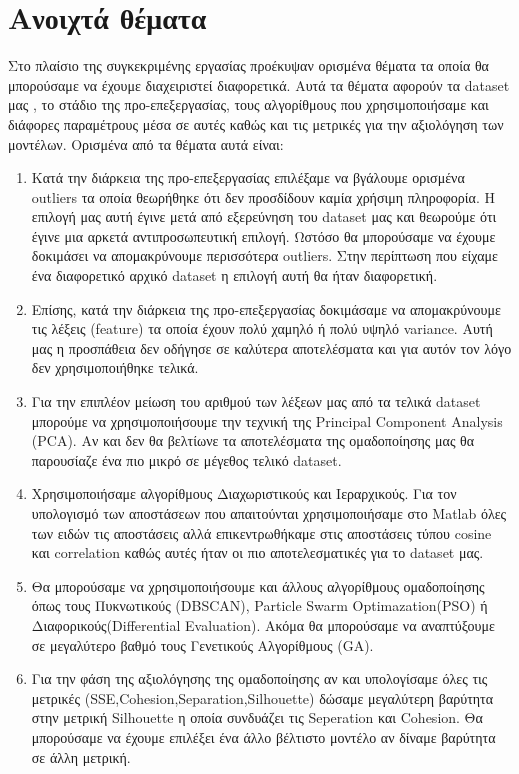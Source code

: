 \chapter{Ανοιχτά θέματα}\label{chapter:openissues}
Στο πλαίσιο της συγκεκριμένης εργασίας προέκυψαν ορισμένα θέματα τα οποία θα μπορούσαμε να έχουμε διαχειριστεί διαφορετικά. Αυτά τα θέματα αφορούν τα dataset μας , το στάδιο της προ-επεξεργασίας, τους αλγορίθμους που χρησιμοποιήσαμε και διάφορες παραμέτρους μέσα σε αυτές καθώς και τις μετρικές για την αξιολόγηση των μοντέλων. Ορισμένα από τα θέματα αυτά είναι:

\begin{enumerate}
    \item Κατά την διάρκεια της προ-επεξεργασίας επιλέξαμε να βγάλουμε ορισμένα outliers τα οποία θεωρήθηκε ότι δεν προσδίδουν καμία χρήσιμη πληροφορία. Η επιλογή μας αυτή έγινε μετά από εξερεύνηση του dataset μας και θεωρούμε ότι έγινε μια αρκετά αντιπροσωπευτική επιλογή. Ωστόσο θα μπορούσαμε να έχουμε δοκιμάσει να απομακρύνουμε περισσότερα outliers. Στην περίπτωση που είχαμε ένα διαφορετικό αρχικό dataset η επιλογή αυτή θα ήταν διαφορετική.
    \item Επίσης, κατά την διάρκεια της προ-επεξεργασίας δοκιμάσαμε να απομακρύνουμε τις λέξεις (feature) τα οποία έχουν πολύ χαμηλό ή πολύ υψηλό variance. Αυτή μας η προσπάθεια δεν οδήγησε σε καλύτερα αποτελέσματα και για αυτόν τον λόγο δεν χρησιμοποιήθηκε τελικά.
    \item Για την επιπλέον μείωση του αριθμού των λέξεων μας από τα τελικά dataset μπορούμε να χρησιμοποιήσουμε την τεχνική της Principal Component Analysis (PCA). Αν και δεν θα βελτίωνε τα αποτελέσματα της ομαδοποίησης μας θα παρουσίαζε ένα πιο μικρό σε μέγεθος τελικό dataset.
    \item Χρησιμοποιήσαμε αλγορίθμους Διαχωριστικούς και Ιεραρχικούς. Για τον υπολογισμό των αποστάσεων που απαιτούνται χρησιμοποιήσαμε στο Matlab όλες των ειδών τις αποστάσεις αλλά επικεντρωθήκαμε στις αποστάσεις τύπου cosine και correlation καθώς αυτές ήταν οι πιο αποτελεσματικές για το dataset μας.
    \item Θα μπορούσαμε να χρησιμοποιήσουμε και άλλους αλγορίθμους ομαδοποίησης όπως τους Πυκνωτικούς (DBSCAN), Particle Swarm Optimazation(PSO) ή Διαφορικούς(Differential Evaluation). Ακόμα θα μπορούσαμε να αναπτύξουμε σε μεγαλύτερο βαθμό τους Γενετικούς Αλγορίθμους (GA).
    \item Για την φάση της αξιολόγησης της ομαδοποίησης αν και υπολογίσαμε όλες τις μετρικές (SSE,Cohesion,Separation,Silhouette) δώσαμε μεγαλύτερη βαρύτητα στην μετρική Silhouette η οποία συνδυάζει τις Seperation και Cohesion. Θα μπορούσαμε να έχουμε επιλέξει ένα άλλο βέλτιστο μοντέλο αν δίναμε βαρύτητα σε άλλη μετρική.

\end{enumerate}
